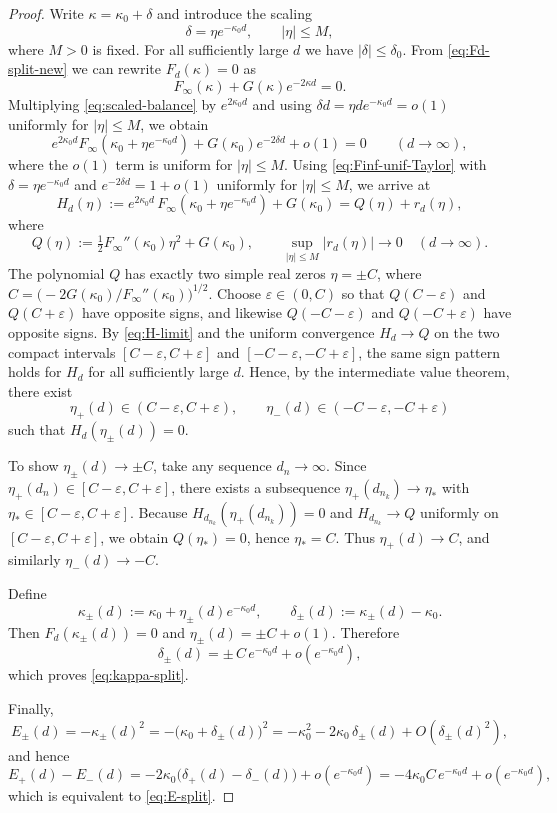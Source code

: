 \documentclass[a4paper,11pt]{article}
\numberwithin{equation}{section}
\theoremstyle{definition}
\theoremstyle{remark}
\begin{document}
\begin{proof}
Write $\kappa=\kappa_0+\delta$ and introduce the scaling
$$
\delta=\eta e^{-\kappa_0 d},\qquad |\eta|\le M,
$$
where $M>0$ is fixed.
For all sufficiently large $d$ we have $|\delta|\le\delta_0$.
From \eqref{eq:Fd-split-new} we can rewrite $F_d(\kappa)=0$ as
\begin{equation}\label{eq:scaled-balance}
F_\infty(\kappa)+G(\kappa)e^{-2\kappa d}=0.
\end{equation}
Multiplying \eqref{eq:scaled-balance} by $e^{2\kappa_0 d}$ and using
$\delta d=\eta d e^{-\kappa_0 d}=o(1)$ uniformly for $|\eta|\le M$, we obtain
$$
e^{2\kappa_0 d}F_\infty(\kappa_0+\eta e^{-\kappa_0 d})
+G(\kappa_0)e^{-2\delta d}
+o(1)
=0
\qquad(d\to\infty),
$$
where the $o(1)$ term is uniform for $|\eta|\le M$.
Using \eqref{eq:Finf-unif-Taylor} with $\delta=\eta e^{-\kappa_0 d}$ and
$e^{-2\delta d}=1+o(1)$ uniformly for $|\eta|\le M$, we arrive at
\begin{equation}\label{eq:H-limit}
H_d(\eta)
:=e^{2\kappa_0 d}\,F_\infty(\kappa_0+\eta e^{-\kappa_0 d})+G(\kappa_0)
=
Q(\eta)+r_d(\eta),
\end{equation}
where
$$
Q(\eta):=\tfrac12F_\infty''(\kappa_0)\eta^2+G(\kappa_0),
\qquad
\sup_{|\eta|\le M}|r_d(\eta)|\to0\quad(d\to\infty).
$$
The polynomial $Q$ has exactly two simple real zeros $\eta=\pm C$, where
$C=\bigl(-2G(\kappa_0)/F_\infty''(\kappa_0)\bigr)^{1/2}$.
Choose $\varepsilon\in(0,C)$ so that $Q(C-\varepsilon)$ and $Q(C+\varepsilon)$
have opposite signs, and likewise $Q(-C-\varepsilon)$ and $Q(-C+\varepsilon)$
have opposite signs.
By \eqref{eq:H-limit} and the uniform convergence $H_d\to Q$ on the two compact
intervals $[C-\varepsilon,C+\varepsilon]$ and $[-C-\varepsilon,-C+\varepsilon]$,
the same sign pattern holds for $H_d$ for all sufficiently large $d$.
Hence, by the intermediate value theorem, there exist
$$
\eta_+(d)\in(C-\varepsilon,C+\varepsilon),\qquad
\eta_-(d)\in(-C-\varepsilon,-C+\varepsilon)
$$
such that $H_d(\eta_\pm(d))=0$.

To show $\eta_\pm(d)\to\pm C$, take any sequence $d_n\to\infty$.
Since $\eta_+(d_n)\in[C-\varepsilon,C+\varepsilon]$, there exists a subsequence
$\eta_+(d_{n_k})\to\eta_*$ with $\eta_*\in[C-\varepsilon,C+\varepsilon]$.
Because $H_{d_{n_k}}(\eta_+(d_{n_k}))=0$ and $H_{d_{n_k}}\to Q$ uniformly on
$[C-\varepsilon,C+\varepsilon]$, we obtain $Q(\eta_*)=0$, hence $\eta_*=C$.
Thus $\eta_+(d)\to C$, and similarly $\eta_-(d)\to -C$.

Define
$$
\kappa_\pm(d):=\kappa_0+\eta_\pm(d)e^{-\kappa_0 d},
\qquad
\delta_\pm(d):=\kappa_\pm(d)-\kappa_0.
$$
Then $F_d(\kappa_\pm(d))=0$ and $\eta_\pm(d)=\pm C+o(1)$.
Therefore
$$
\delta_\pm(d)=\pm\,C\,e^{-\kappa_0 d}+o(e^{-\kappa_0 d}),
$$
which proves \eqref{eq:kappa-split}.

Finally,
$$
E_\pm(d)=-\kappa_\pm(d)^2
=-\bigl(\kappa_0+\delta_\pm(d)\bigr)^2
=-\kappa_0^2-2\kappa_0\,\delta_\pm(d)+O(\delta_\pm(d)^2),
$$
and hence
$$
E_+(d)-E_-(d)
=-2\kappa_0\bigl(\delta_+(d)-\delta_-(d)\bigr)+o(e^{-\kappa_0 d})
=-4\kappa_0C\,e^{-\kappa_0 d}+o(e^{-\kappa_0 d}),
$$
which is equivalent to \eqref{eq:E-split}.
\end{proof}
\end{document}
